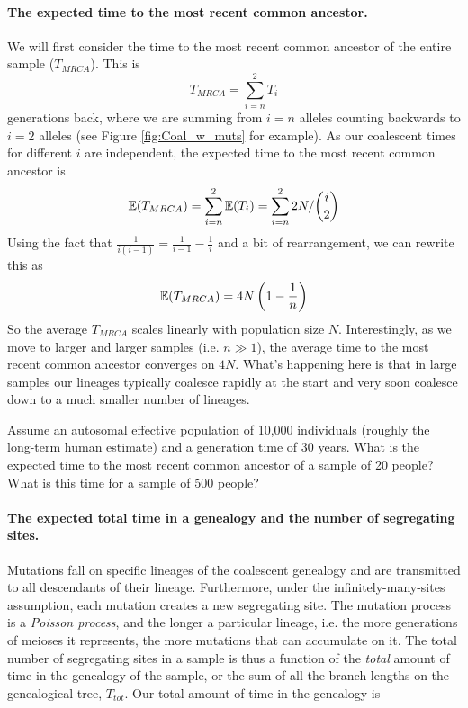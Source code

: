 \paragraph{The expected time to the most recent common ancestor.}
We will first consider the time to the most recent common ancestor of
the entire sample ($T_{MRCA}$). This is
\begin{equation}
T_{MRCA} = \sum_{i=n}^2 T_i
\end{equation}
generations back, where we are summing from $i=n$ alleles counting backwards to $i=2$ alleles (see Figure \ref{fig:Coal_w_muts} for example). As our coalescent times for different $i$ are independent, the expected time to the most recent common ancestor
is
\begin{equation}
\mathbb{E}(T_{MRCA}) = \sum_{i=n}^2 \mathbb{E}(T_i) = \sum_{i=n}^2  2N/{i \choose
 2}
\end{equation}
Using the fact that $\frac{1}{i(i-1)}=\frac{1}{i-1} - \frac{1}{i}$ and a bit of
rearrangement, we can rewrite this as
\begin{equation} 
\mathbb{E}(T_{MRCA}) = 4N\left(1- \frac{1}{n} \right) \label{TMRCA_neutral}
\end{equation}
So the average $T_{MRCA}$ scales linearly with population
size $N$. Interestingly, as we move to larger and larger samples (i.e. $n \gg 1$), the average
time to the most recent common ancestor converges on $4N$. What's
happening here is that in large samples our lineages typically coalesce rapidly
at the start and very soon coalesce down to a much smaller number of
lineages.   \\

\begin{question}
Assume an autosomal effective population of 10,000 individuals (roughly the long-term human estimate) and a generation time of 30 years. What is the expected time to the most recent common ancestor of a sample of 20 people? What is this time for a sample of 500 people?  
\end{question}
\paragraph{The expected total time in a genealogy and the number of
  segregating sites.}

Mutations fall on specific lineages of the coalescent genealogy and are transmitted to all descendants of their lineage. Furthermore, under the infinitely-many-sites assumption, each mutation creates a new segregating site. The mutation process is a
\emph{Poisson process}, and the longer a particular lineage, i.e. the more generations of meioses it represents, the more
mutations that can accumulate on it. The total number of segregating sites in
a sample is thus a function of the \emph{total} amount of time in the
genealogy of the sample, or the sum of all the branch lengths on the genealogical tree,
$T_{tot}$. Our total amount of time in the genealogy is

